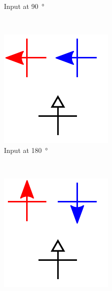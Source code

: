 \documentclass[11pt,a4paper,english]{article}
\newcommand{\rulesep}{\unskip\ \vrule\ }
\begin{document}
\begin{figure}
\begin{subfigure}[t]{0.23\textwidth}
    \caption{Input at \SI{90}{\degree}}
\end{subfigure}
\rulesep
\begin{subfigure}[t]{0.23\textwidth}
    \includegraphics[width=\textwidth]{Figures/half_adder/schematic/000006_inputs_In2_0213/Input 180 deg.pdf}
    \caption{Input at \SI{180}{\degree}}
\end{subfigure}
\rulesep
\begin{subfigure}[t]{0.23\textwidth}
    \includegraphics[width=\textwidth]{Figures/half_adder/schematic/000006_inputs_In2_0213/Input 270 deg.pdf}

\end{subfigure}
\end{figure}
\end{document}
